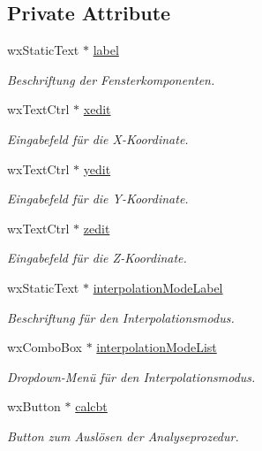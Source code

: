 \subsection*{Private Attribute}
\begin{DoxyCompactItemize}
\item 
wx\-Static\-Text $\ast$ \hyperlink{classGUIAnalyzePointWindow_ae3f474800a7f7d9e4a897bdf33510f01}{label}
\begin{DoxyCompactList}\small\item\em Beschriftung der Fensterkomponenten. \end{DoxyCompactList}\item 
wx\-Text\-Ctrl $\ast$ \hyperlink{classGUIAnalyzePointWindow_a4c3d50b2c5c38b8b757cdb1c04ea83b6}{xedit}
\begin{DoxyCompactList}\small\item\em Eingabefeld für die X-\/\-Koordinate. \end{DoxyCompactList}\item 
wx\-Text\-Ctrl $\ast$ \hyperlink{classGUIAnalyzePointWindow_ac4352df05ac2a001551801a90fc8bc42}{yedit}
\begin{DoxyCompactList}\small\item\em Eingabefeld für die Y-\/\-Koordinate. \end{DoxyCompactList}\item 
wx\-Text\-Ctrl $\ast$ \hyperlink{classGUIAnalyzePointWindow_a173e639b35cc6c18a74fb746b8664c8c}{zedit}
\begin{DoxyCompactList}\small\item\em Eingabefeld für die Z-\/\-Koordinate. \end{DoxyCompactList}\item 
wx\-Static\-Text $\ast$ \hyperlink{classGUIAnalyzePointWindow_a6a1b5c74ab4aca0f3ccea3ef83043b35}{interpolation\-Mode\-Label}
\begin{DoxyCompactList}\small\item\em Beschriftung für den Interpolationsmodus. \end{DoxyCompactList}\item 
wx\-Combo\-Box $\ast$ \hyperlink{classGUIAnalyzePointWindow_a6b2da34e788e56e70789d2cfc9767357}{interpolation\-Mode\-List}
\begin{DoxyCompactList}\small\item\em Dropdown-\/\-Menü für den Interpolationsmodus. \end{DoxyCompactList}\item 
wx\-Button $\ast$ \hyperlink{classGUIAnalyzePointWindow_a2650076436d57254fa9dd0df3783593e}{calcbt}
\begin{DoxyCompactList}\small\item\em Button zum Auslösen der Analyseprozedur. \end{DoxyCompactList}\end{DoxyCompactItemize}


